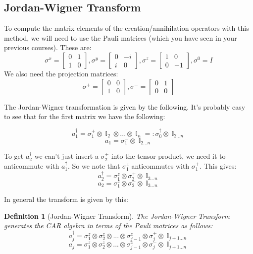 \documentclass{article}
\DeclareMathOperator{\II}{\mathbb{I}}
\newtheorem{defn}{Definition}
\begin{document}
\subsection{Jordan-Wigner Transform}
To compute the matrix elements of the creation/annihilation operators with this method, we will need to use the Pauli matrices (which you have seen in your previous courses). These are:
\begin{equation}
\sigma^x = \begin{bmatrix}0&1\\1&0\end{bmatrix}, \sigma^y = \begin{bmatrix}0&-i\\i&0\end{bmatrix}, \sigma^z = \begin{bmatrix}1&0\\0&-1\end{bmatrix}, \sigma^0 = I
\end{equation}
We also need the projection matrices:
\begin{equation}
\sigma^+ = \begin{bmatrix}0&0\\1&0\end{bmatrix}, \sigma^- = \begin{bmatrix}0&1\\0&0\end{bmatrix}
\end{equation}

The Jordan-Wigner transformation is given by the following. It's probably easy to see that for the first matrix we have the following:

\[a_1^\dagger = \sigma_1^+\otimes \II_2\otimes...\otimes\II_n =: \sigma_0^\dagger \otimes \II_{2...n}\]
\[a_1 = \sigma_1^- \otimes \II_{2...n}\]

To get $a_2^\dagger$ we can't just insert a $\sigma_2^+$ into the tensor product, we need it to anticommute with $a_1^\dagger$. So we note that $\sigma_1^z$ anticommutes with $\sigma_1^+$. This gives:
\[a_2^\dagger = \sigma_1^z \otimes \sigma_2^+\otimes \II_{3...n}\]
\[a_2 = \sigma_1^z\otimes \sigma_2^- \otimes \II_{3...n}\]

In general the transform is given by this:
\begin{defn}[Jordan-Wigner Transform]
The Jordan-Wigner Transform generates the CAR algebra in terms of the Pauli matrices as follows:
\begin{equation}
a_j^\dagger = \sigma_1^z\otimes\sigma_2^z\otimes...\otimes \sigma_{j-1}^z \otimes \sigma_j^+ \otimes \II_{j+1...n}
\end{equation}
\begin{equation}
a_j = \sigma_1^z\otimes\sigma_2^z\otimes...\otimes \sigma_{j-1}^z \otimes \sigma_j^- \otimes \II_{j+1...n}
\end{equation}
\end{defn}
\end{document}
